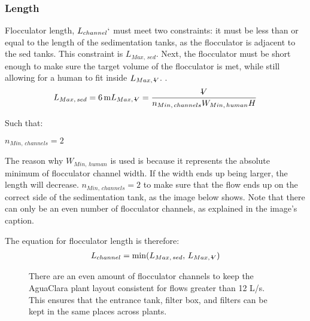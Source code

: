 \documentclass[letterpaper,10pt,english]{sphinxmanual}
\let\sphinxpxdimen\pdfpxdimen\else\newdimen\sphinxpxdimen
\begin{document}
\subsubsection{Length}
\label{\detokenize{Flocculation/Floc_Design:length}}
Flocculator length, \(L_{channel}`\) must meet two constraints: it must be less than or equal to the length of the sedimentation tanks, as the flocculator is adjacent to the sed tanks. This constraint is \(L_{Max, \, sed}\). Next, the flocculator must be short enough to make sure the target volume of the flocculator is met, while still allowing for a human to fit inside \(L_{Max, \, \rlap{-} V}\). .
\begin{equation}\label{equation:Flocculation/Floc_Design:Flocculation/Floc_Design:18}
\begin{split}L_{Max, \, sed} = 6 \, {\rm m}
L_{Max, \, \rlap{-}V} = \frac{\rlap{-} V}{n_{Min, \, channels} W_{Min, \, human} H}\end{split}
\end{equation}
\begin{DUlineblock}{0em}
\item[] Such that:
\item[] \(n_{Min, \, channels} = 2\)
\end{DUlineblock}

The reason why \(W_{Min, \, human}\) is used is because it represents the absolute minimum of flocculator channel width. If the width ends up being larger, the length will decrease. \(n_{Min, \, channels} = 2\)  to make sure that the flow ends up on the correct side of the sedimentation tank, as the image below shows. Note that there can only be an even number of flocculator channels, as explained in the image’s caption.

The equation for  flocculator length is therefore:
\begin{equation}\label{equation:Flocculation/Floc_Design:Flocculation/Floc_Design:19}
\begin{split}L_{channel} = {\rm min}(L_{Max, \, sed}, \, L_{Max, \, \rlap{-} V})\end{split}
\end{equation}
\begin{figure}[htbp]
\centering
\capstart

\noindent\sphinxincludegraphics[width=600\sphinxpxdimen]{{Floc_channels}.jpg}
\caption{There are an even amount of flocculator channels to keep the AguaClara plant layout consistent for flows greater than 12 L/s. This ensures that the entrance tank, filter box, and filters can be kept in the same places across plants.}\label{\detokenize{Flocculation/Floc_Design:id18}}\label{\detokenize{Flocculation/Floc_Design:figure-floc-channels}}\end{figure}
\end{document}
